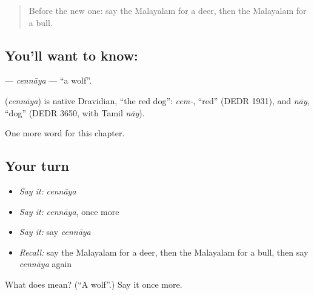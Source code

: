 \label{lesson:ML-C291-cennaya}



\begin{quote}
Before the new one: say the Malayalam for a deer, then the Malayalam for a bull.
\end{quote}

\subsection*{You'll want to know: }
\textbf{} — \emph{cennāya} — \textquotedblleft{}a wolf\textquotedblright{}.

\begin{cousinweb}
\textbf{} (\emph{cennāya}) is native Dravidian, \textquotedblleft{}the red dog\textquotedblright{}: \emph{cem-}, \textquotedblleft{}red\textquotedblright{} (DEDR 1931), and \emph{nāy}, \textquotedblleft{}dog\textquotedblright{} (DEDR 3650, with Tamil \emph{nāy}).
\end{cousinweb}

\begin{grammarlens}[title={What you've built}]
One more word for this chapter.
\end{grammarlens}

\subsection*{Your turn}
\begin{itemize}
\raggedright
  \item \emph{Say it:} \emph{cennāya}
  \item \emph{Say it:} \emph{cennāya}, once more
  \item \emph{Say it:} say \emph{cennāya}
  \item \emph{Recall:} say the Malayalam for a deer, then the Malayalam for a bull, then say \emph{cennāya} again
\end{itemize}

\begin{tcolorbox}[breakable,colback=teal!4,colframe=teal!35!black,title={Before you move on}]
What does  mean? (\textquotedblleft{}A wolf\textquotedblright{}.) Say it once more.
\end{tcolorbox}
